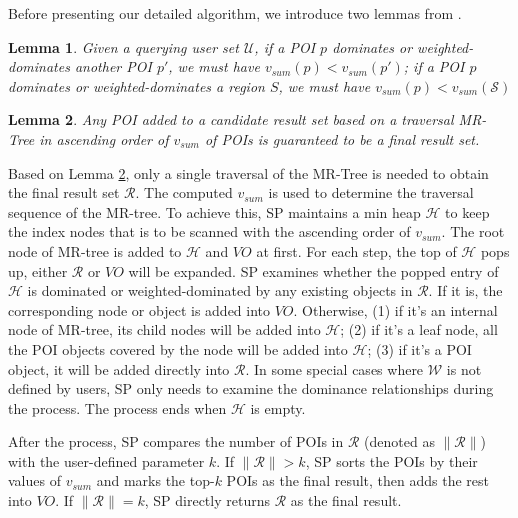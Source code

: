 \documentclass[10pt, conference, compsocconf]{IEEEtran}
\newtheorem{lemma}{Lemma}
\begin{document}
Before presenting our detailed algorithm, we introduce two lemmas from \cite{papadias2003optimal}.


\begin{lemma}\label{Lemma1}
    Given a querying user set $\mathcal{U}$, if a POI $p$ dominates or weighted-dominates another POI $p'$, we must have $v_{sum}(p) < v_{sum}(p')$; if a POI $p$ dominates or weighted-dominates a region $S$, we must have $v_{sum}(p)<v_{sum}(\mathcal{S})$
\end{lemma}

\begin{lemma}\label{Lemma2}
    Any POI added to a candidate result set based on a traversal MR-Tree in ascending order of $v_{sum}$ of POIs is guaranteed to be a final result set.
\end{lemma}

Based on Lemma \ref{Lemma2}, only a single traversal of the MR-Tree is needed to obtain the final result set $\mathcal{R}$. The computed $v_{sum}$ is used to determine the traversal sequence of the MR-tree. To achieve this, SP maintains a min heap $\mathcal{H}$ to keep the index nodes that is to be scanned with the ascending order of $v_{sum}$. The root node of MR-tree is added to $\mathcal{H}$ and $VO$ at first. For each step, the top of $\mathcal{H}$ pops up, either $\mathcal{R}$ or $VO$ will be expanded. SP examines whether the popped entry of $\mathcal{H}$ is dominated or weighted-dominated by any existing objects in $\mathcal{R}$. If it is, the corresponding node or object is added into $VO$. Otherwise, (1) if it's an internal node of MR-tree, its child nodes will be added into $\mathcal{H}$; (2) if it's a leaf node, all the POI objects covered by the node will be added into $\mathcal{H}$; (3) if it's a POI object, it will be added directly into $\mathcal{R}$. In some special cases where $\mathcal{W}$ is not defined by users, SP only needs to examine the dominance relationships during the process. The process ends when $\mathcal{H}$ is empty.

After the process, SP compares the number of POIs in $\mathcal{R}$ (denoted as $\|\mathcal{R}\|$) with the user-defined parameter $k$. If $\|\mathcal{R}\| > k$, SP sorts the POIs by their values of $v_{sum}$ and marks the top-$k$ POIs as the final result, then adds the rest into $VO$. If $\|\mathcal{R}\| = k$, SP directly returns $\mathcal{R}$ as the final result. 
\end{document}
